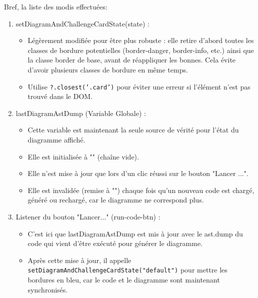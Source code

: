 \documentclass[11pt,a4paper]{article}
\begin{document}
Bref, la liste des modis effectuées:
\begin{enumerate}
    \item setDiagramAndChallengeCardState(state) :
    \begin{itemize}
        \item Légèrement modifiée pour être plus robuste : elle retire d'abord toutes les classes de bordure potentielles (border-danger, border-info, etc.) ainsi que la classe border de base, avant de réappliquer les bonnes. Cela évite d'avoir plusieurs classes de bordure en même temps.
        \item Utilise \texttt{?.closest('.card')} pour éviter une erreur si l'élément n'est pas trouvé dans le DOM.
    \end{itemize}
    
    \item lastDiagramAstDump (Variable Globale) :
    \begin{itemize}
        \item Cette variable est maintenant la seule source de vérité pour l'état du diagramme affiché.
        \item Elle est initialisée à "" (chaîne vide).
        \item Elle n'est mise à jour que lors d'un clic réussi sur le bouton "Lancer ...".
        \item Elle est invalidée (remise à "") chaque fois qu'un nouveau code est chargé, généré ou rechargé, car le diagramme ne correspond plus.
    \end{itemize}

    \item Listener du bouton "Lancer..." (run-code-btn) :
    \begin{itemize}
        \item C'est ici que lastDiagramAstDump est mis à jour avec le ast.dump du code qui vient d'être exécuté pour générer le diagramme.
        \item Après cette mise à jour, il appelle \texttt{setDiagramAndChallengeCardState("default")} pour mettre les bordures en bleu, car le code et le diagramme sont maintenant synchronisés.
    \end{itemize}


\end{enumerate}
\end{document}
